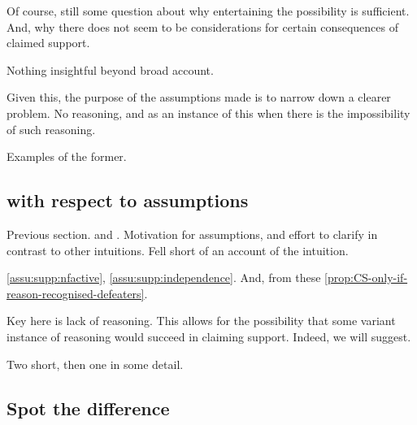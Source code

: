 \begin{note}
  Of course, still some question about why entertaining the possibility is sufficient.
  And, why there does not seem to be considerations for certain consequences of claimed support.

  Nothing insightful beyond broad account.

  Given this, the purpose of the assumptions made is to narrow down a clearer problem.
  No reasoning, and as an instance of this when there is the impossibility of such reasoning.

  Examples of the former.
\end{note}

\subsection{ with respect to assumptions}
\label{sec:illustrations-wrt-assumption}

\begin{note}
  Previous section.
  \ideaCSA{} and \ideaCSB{}.
  Motivation for assumptions, and effort to clarify in contrast to other intuitions.
  Fell short of an account of the intuition.

  \autoref{assu:supp:nfactive}, \autoref{assu:supp:independence}.
  And, from these \autoref{prop:CS-only-if-reason-recognised-defeaters}.

  Key here is lack of reasoning.
  This allows for the possibility that some variant instance of reasoning would succeed in claiming support.
  Indeed, we will suggest.
\end{note}

\begin{note}
  Two short, then one in some detail.
\end{note}

\subsection{Spot the difference}

